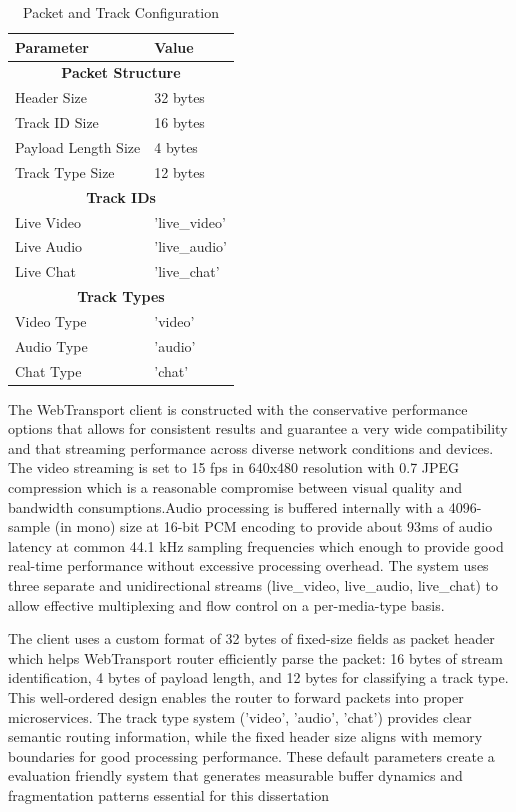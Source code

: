 \begin{table}[h!]
\centering
\caption{Packet and Track Configuration}
\label{tab:packet-track-config}
\renewcommand{\arraystretch}{1.3}
\begin{tabular}{|l|l|}
\hline
\textbf{Parameter} & \textbf{Value} \\
\hline
\multicolumn{2}{|c|}{\textbf{Packet Structure}} \\
\hline
Header Size & 32 bytes \\
\hline
Track ID Size & 16 bytes \\
\hline
Payload Length Size & 4 bytes \\
\hline
Track Type Size & 12 bytes \\
\hline
\multicolumn{2}{|c|}{\textbf{Track IDs}} \\
\hline
Live Video & 'live\_video' \\
\hline
Live Audio & 'live\_audio' \\
\hline
Live Chat & 'live\_chat' \\
\hline

\multicolumn{2}{|c|}{\textbf{Track Types}} \\
\hline
Video Type & 'video' \\
\hline
Audio Type & 'audio' \\
\hline
Chat Type & 'chat' \\
\hline
\end{tabular}
\end{table}

The WebTransport client is constructed with the conservative performance options that allows for consistent results and guarantee a very wide compatibility and that streaming performance across diverse network conditions and devices. The video streaming is set to 15 fps in 640x480 resolution with 0.7 JPEG compression which is a reasonable compromise between visual quality and bandwidth consumptions.Audio processing is buffered internally with a 4096-sample (in mono) size at 16-bit PCM encoding to provide about 93ms of audio latency at common 44.1 kHz sampling frequencies which enough to provide good real-time performance without excessive processing overhead. The system uses three separate and unidirectional streams (live\_video, live\_audio, live\_chat) to allow effective multiplexing and flow control on a per-media-type basis.

The client uses a custom format of 32 bytes of fixed-size fields as packet header which helps WebTransport router efficiently parse the packet: 16 bytes of stream identification, 4 bytes of payload length, and 12 bytes for classifying a track type. This well-ordered design enables the router to forward packets into proper microservices. The track type system ('video', 'audio', 'chat') provides clear semantic routing information, while the fixed header size aligns with memory boundaries for good processing performance. These default parameters create a evaluation friendly system that generates measurable buffer dynamics and fragmentation patterns essential for this dissertation

